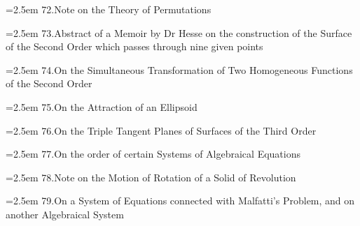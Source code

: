 \documentclass[11pt]{article}
\begin{document}
\noindent\hangindent=2.5em
72.\quad Note on the Theory of Permutations\par
\hspace{1.5em}{\small Phil.\ Mag.\ t.~xxxiv.\ (1849), pp.~527--529}\par

\noindent\hangindent=2.5em
73.\quad Abstract of a Memoir by Dr Hesse on the construction of the Surface of the Second Order which passes through nine given points\par
\hspace{1.5em}{\small Camb.\ and Dubl.\ Math.\ Jour.\ t.~iv.\ (1849), pp.~44--46}\par

\noindent\hangindent=2.5em
74.\quad On the Simultaneous Transformation of Two Homogeneous Functions of the Second Order\par
\hspace{1.5em}{\small Camb.\ and Dubl.\ Math.\ Jour.\ t.~iv.\ (1849), pp.~47--50}\par

\noindent\hangindent=2.5em
75.\quad On the Attraction of an Ellipsoid\par
\hspace{1.5em}{\small Camb.\ and Dubl.\ Math.\ Jour.\ t.~iv.\ (1849), pp.~50--65}\par

\bigskip

\noindent\hangindent=2.5em
76.\quad On the Triple Tangent Planes of Surfaces of the Third Order\par
\hspace{1.5em}{\small Camb.\ and Dubl.\ Math.\ Jour.\ t.~iv.\ (1849), pp.~118--132}\par

\noindent\hangindent=2.5em
77.\quad On the order of certain Systems of Algebraical Equations\par
\hspace{1.5em}{\small Camb.\ and Dubl.\ Math.\ Jour.\ t.~iv.\ (1849), pp.~132--137}\par

\noindent\hangindent=2.5em
78.\quad Note on the Motion of Rotation of a Solid of Revolution\par
\hspace{1.5em}{\small Camb.\ and Dubl.\ Math.\ Jour.\ t.~iv.\ (1849), pp.~268--270}\par

\noindent\hangindent=2.5em
79.\quad On a System of Equations connected with Malfatti's Problem, and on another Algebraical System\par
\hspace{1.5em}{\small Camb.\ and Dubl.\ Math.\ Jour.\ t.~iv.\ (1849), pp.~270--275}\par
\end{document}
